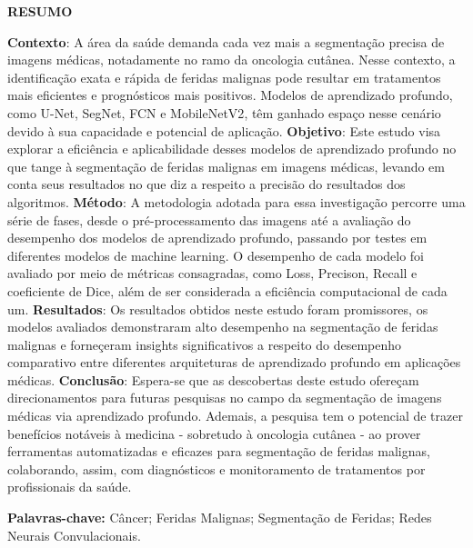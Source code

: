 \begin{center}
    \textbf{RESUMO}
\end{center}

\textbf{Contexto}: A área da saúde demanda cada vez mais a segmentação precisa de imagens médicas, notadamente no ramo da oncologia cutânea. Nesse contexto, a identificação exata e rápida de feridas malignas pode resultar em tratamentos mais eficientes e prognósticos mais positivos. Modelos de aprendizado profundo, como \acf{U-Net}, \acf{SegNet}, \acf{FCN} e \acf{MobileNetV2}, têm ganhado espaço nesse cenário devido à sua capacidade e potencial de aplicação. \textbf{Objetivo}: Este estudo visa explorar a eficiência e aplicabilidade desses modelos de aprendizado profundo no que tange à segmentação de feridas malignas em imagens médicas, levando em conta seus resultados no que diz a respeito a precisão do resultados dos algoritmos. \textbf{Método}: A metodologia adotada para essa investigação percorre uma série de fases, desde o pré-processamento das imagens até a avaliação do desempenho dos modelos de aprendizado profundo, passando por testes em diferentes modelos de machine learning. O desempenho de cada modelo foi avaliado por meio de métricas consagradas, como Loss, Precison, Recall e coeficiente de Dice, além de ser considerada a eficiência computacional de cada um. \textbf{Resultados}: Os resultados obtidos neste estudo foram promissores, os modelos avaliados demonstraram alto desempenho na segmentação de feridas malignas e forneçeram insights significativos a respeito do desempenho comparativo entre diferentes arquiteturas de aprendizado profundo em aplicações médicas. \textbf{Conclusão}: Espera-se que as descobertas deste estudo ofereçam direcionamentos para futuras pesquisas no campo da segmentação de imagens médicas via aprendizado profundo. Ademais, a pesquisa tem o potencial de trazer benefícios notáveis à medicina - sobretudo à oncologia cutânea - ao prover ferramentas automatizadas e eficazes para segmentação de feridas malignas, colaborando, assim, com diagnósticos e monitoramento de tratamentos por profissionais da saúde.

\textbf{Palavras-chave:}  Câncer; Feridas Malignas; Segmentação de Feridas; Redes Neurais Convulacionais.